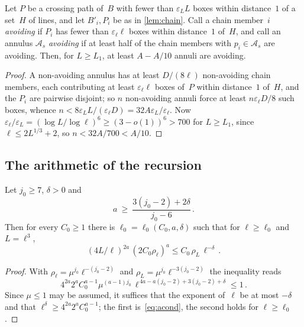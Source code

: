 \documentclass[11pt,letterpaper]{article}
\begin{document}
\begin{lemma}
\label{lem:avoidinherit}
Let $P$ be a crossing path of~$B$ with fewer than $\varepsilon_LL$ boxes within distance~$1$ of a set~$H$ of lines, and let $B'_i,P_i$ be as in \cref{lem:chain}. Call a chain member~$i$ \emph{avoiding} if $P_i$ has fewer than $\varepsilon_\ell\ell$ boxes within distance~$1$ of~$H$, and call an annulus $\mathcal A_s$ \emph{avoiding} if at least half of the chain members with $p_i\in\mathcal A_s$ are avoiding. Then, for $L\ge L_1$, at least $A-A/10$ annuli are avoiding.
\end{lemma}

\begin{proof}
A non-avoiding annulus has at least $D/(8\ell)$ non-avoiding chain members, each contributing at least $\varepsilon_\ell\ell$ boxes of~$P$ within distance~$1$ of~$H$, and the $P_i$ are pairwise disjoint; so $n$ non-avoiding annuli force at least $n\varepsilon_\ell D/8$ such boxes, whence $n<8\varepsilon_LL/(\varepsilon_\ell D)=32A\varepsilon_L/\varepsilon_\ell$. Now $\varepsilon_\ell/\varepsilon_L=(\log L/\log\ell)^6\ge(3-o(1))^6>700$ for $L\ge L_1$, since $\ell\le2L^{1/3}+2$, so $n<32A/700<A/10$.
\end{proof}

\subsection{The arithmetic of the recursion}

\begin{lemma}
\label{lem:basic}
Let $j_0\ge7$, $\delta>0$ and
\begin{equation}
\label{eq:acond}
  a\ \ge\ \frac{3(j_0-2)+2\delta}{j_0-6}\,.
\end{equation}
Then for every $C_0\ge1$ there is $\ell_0=\ell_0(C_0,a,\delta)$ such that for $\ell\ge\ell_0$ and $L=\ell^3$,
\begin{equation}
\label{eq:basic}
  (4L/\ell)^{2a}\,(2C_0\rho_\ell)^a\le C_0\,\rho_L\,\ell^{-\delta}\,.
\end{equation}
\end{lemma}

\begin{proof}
With $\rho_\ell=\mu^{j_0}\ell^{-(j_0-2)}$ and $\rho_L=\mu^{j_0}\ell^{-3(j_0-2)}$ the inequality reads
\begin{equation*}
  4^{2a}2^aC_0^{a-1}\mu^{(a-1)j_0}\,\ell^{\,4a-a(j_0-2)+3(j_0-2)+\delta}\le1\,.
\end{equation*}
Since $\mu\le1$ may be assumed, it suffices that the exponent of~$\ell$ be at most $-\delta$ and that $\ell^{\delta}\ge4^{2a}2^aC_0^{a-1}$; the first is~\eqref{eq:acond}, the second holds for $\ell\ge\ell_0$.
\end{proof}
\end{document}
